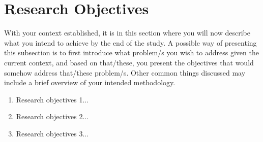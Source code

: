 \section{Research Objectives}
With your context established, it is in this section where you will now describe what you intend to achieve by the end of the study. A possible way of presenting this subsection is to first introduce what problem/s you wish to address given the current context, and based on that/these, you present the objectives that would somehow address that/these problem/s. Other common things discussed may include a brief overview of your intended methodology.

\begin{enumerate}
    \item Research objectives 1...
    \item Research objectives 2...
    \item Research objectives 3...
\end{enumerate}

